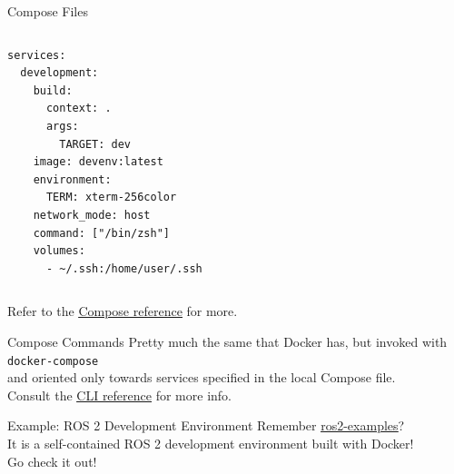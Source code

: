 \begin{frame}[fragile]{Compose Files}
\begin{columns}
\begin{lstlisting}[language=compose, caption=Minimal example of a Compose file]
services:
  development:
    build:
      context: .
      args:
        TARGET: dev
    image: devenv:latest
    environment:
      TERM: xterm-256color
    network_mode: host
    command: ["/bin/zsh"]
    volumes:
      - ~/.ssh:/home/user/.ssh
\end{lstlisting}
\end{columns}
Refer to the \href{https://docs.docker.com/compose/compose-file/}{\color{blue}\underline{Compose reference}} for more.
\end{frame}

\begin{frame}{Compose Commands}
Pretty much the same that Docker has, but invoked with\\\vspace{2pt}
\texttt{docker-compose}\\\vspace{2pt}
and oriented only towards services specified in the local Compose file.\\
Consult the \href{https://docs.docker.com/compose/reference/}{\color{blue}\underline{CLI reference}} for more info.
\end{frame}

\begin{frame}{Example: ROS 2 Development Environment}
  Remember \href{https://github.com/IntelligentSystemsLabUTV/ros2-examples}{\color{blue}\underline{ros2-examples}}?\\
  It is a self-contained ROS 2 development environment built with Docker!\\
  Go check it out!
\end{frame}
